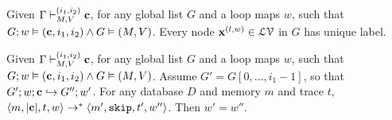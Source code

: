 \documentclass[a4paper,11pt]{article}
\begin{document}
\begin{lem}
Given $ \Gamma \vdash_{M,V}^{(i_1,i_2)} \boldsymbol{\mathbf{c}}$, for any global list $G$ and a loop maps $w$, such that $G ;w \vDash (\boldsymbol{\mathbf{c}}, i_1, i_2) \land G \vDash (M,V)$. Every node $\boldsymbol{\mathbf{x}}^{(l,w)} \in \mathcal{LV}$ in $G$ has unique label.
\end{lem}

\begin{lem}\label{lem:samew}
Given $ \Gamma \vdash_{M,V}^{(i_1,i_2)} \boldsymbol{\mathbf{c}}$, for any global list $G$ and a loop maps $w$, such that $G ;w \vDash (\boldsymbol{\mathbf{c}}, i_1, i_2) \land G \vDash (M,V)$. 
Assume $G' = G[0, \ldots,i_1-1]$, so that $G';w ;\boldsymbol{\mathbf{c}} \hookrightarrow G'' ; w'$. For any database $D$ and memory $m$ and trace $t$,  $\langle m, |\boldsymbol{\mathbf{c}}|, t, w \rangle \to^{*} \langle m', \mathtt{skip}, t', w'' \rangle$. Then $w' = w''$.  
\end{lem}
\end{document}
